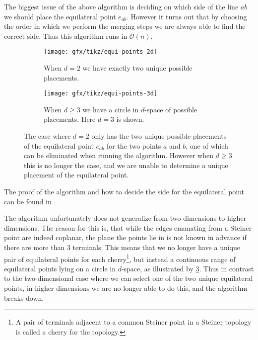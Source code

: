 The biggest issue of the above algorithm is deciding on which side of the line
$ab$ we should place the equilateral point $e_{ab}$. However it turns out that
by choosing the order in which we perform the merging steps we are always able
to find the correct side. Thus this algorithm runs in $\mathcal{O}(n)$.


\begin{figure}[htbp]
  \centering
  \begin{subfigure}[t]{0.4\textwidth}
    \texttt{[image: gfx/tikz/equi-points-2d]}
    \caption{When $d = 2$ we have exactly two unique possible
      placements.\label{fig:equi-points-2d}}
  \end{subfigure}\hspace{1em}%
  \begin{subfigure}[t]{0.4\textwidth}
    \texttt{[image: gfx/tikz/equi-points-3d]}
    \caption{When $d \ge 3$ we have a circle in $d$-space of possible
      placements. Here $d = 3$ is shown.\label{fig:equi-points-3d}}
  \end{subfigure}
  \caption[Equilateral points in 2D and $d$-space]{The case where $d = 2$ only
    has the two unique possible placements of the equilateral point $e_{ab}$ for the
    two points $a$ and $b$, one of which can be eliminated when running the
    algorithm. However when $d \ge 3$ this is no longer the case, and we are
    unable to determine a unique placement of the equilateral
    point.\label{fig:equi-points}}
\end{figure}

The proof of the algorithm and how to decide the side for the equilateral point
can be found in \textcite[ch.~1]{brazil2015}.

The algorithm unfortunately does not generalize from two dimensions to higher
dimensions. The reason for this is, that while the edges emanating from a
Steiner point are indeed coplanar, the plane the points lie in is not known in
advance if there are more than $3$ terminals. This means that we no longer have
a unique pair of equilateral points for each cherry\footnote{A pair of terminals
  adjacent to a common Steiner point in a Steiner topology is called a cherry
  for the topology.}, but instead a continuous range of equilateral points lying
on a circle in $d$-space, as illustrated by \cref{fig:equi-points}. Thus in
contrast to the two-dimensional case where we can select one of the two unique
equilateral points, in higher dimensions we are no longer able to do this, and
the algorithm breaks down.

